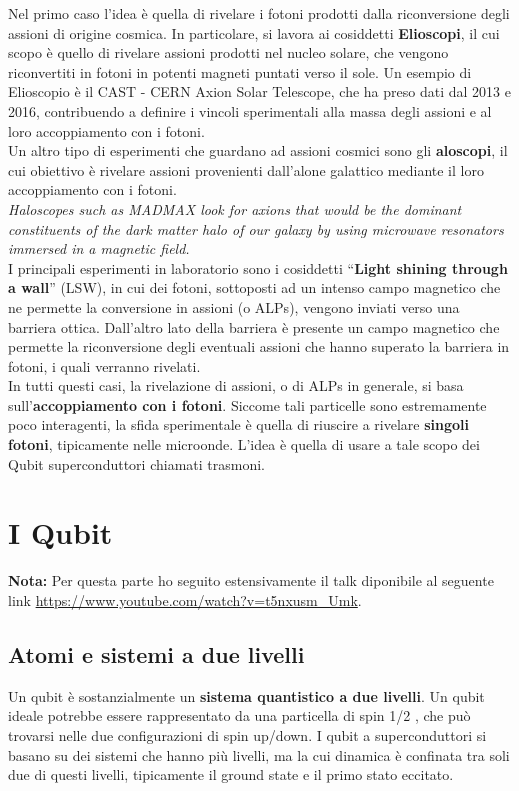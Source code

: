 \documentclass[10pt,a4paper]{article}
\begin{document}
Nel primo caso l’idea è quella di rivelare i fotoni prodotti dalla riconversione degli assioni di origine cosmica. In particolare, si lavora ai cosiddetti \textbf{Elioscopi}, il cui scopo è quello di rivelare assioni prodotti nel nucleo solare, che vengono riconvertiti in fotoni in potenti magneti puntati verso il sole. Un esempio di Elioscopio è il CAST - CERN Axion Solar Telescope, che ha preso dati dal 2013 e 2016, contribuendo a definire i vincoli sperimentali alla massa degli assioni e al loro accoppiamento con i fotoni.\\

Un altro tipo di esperimenti che guardano ad assioni cosmici sono gli \textbf{aloscopi}, il cui obiettivo è rivelare assioni provenienti dall’alone galattico mediante il loro accoppiamento con i fotoni. \\
\textit{Haloscopes such as  MADMAX look for axions that would be the dominant constituents of the dark matter halo of our galaxy by using microwave resonators immersed in a magnetic field.}\\

I principali esperimenti in laboratorio sono i cosiddetti “\textbf{Light shining through a wall}” (LSW), in cui dei fotoni, sottoposti ad un intenso campo magnetico che ne permette la conversione in assioni (o ALPs), vengono inviati verso una barriera ottica. Dall’altro lato della barriera è presente un campo magnetico che permette la riconversione degli eventuali assioni che hanno superato la barriera in fotoni, i quali verranno rivelati.\\



In tutti questi casi, la rivelazione di assioni, o di ALPs in generale, si basa sull’\textbf{accoppiamento con i fotoni}. Siccome tali particelle sono estremamente poco interagenti, la sfida sperimentale è quella di riuscire a rivelare \textbf{singoli fotoni}, tipicamente nelle microonde.
L’idea è quella di usare a tale scopo dei Qubit superconduttori chiamati trasmoni.


\section{I Qubit}

\textbf{Nota:} Per questa parte ho seguito estensivamente il talk diponibile al seguente link \url{https://www.youtube.com/watch?v=t5nxusm_Umk}.
\subsection{Atomi e sistemi a due livelli}
Un qubit è sostanzialmente un \textbf{sistema quantistico a due livelli}.
Un qubit ideale potrebbe essere rappresentato da una particella di spin 1/2 , che può trovarsi nelle due configurazioni di spin up/down. I qubit a superconduttori si basano su dei sistemi che hanno più livelli, ma la cui dinamica è confinata tra soli due di questi livelli, tipicamente il ground state e il primo stato eccitato.\\
\end{document}
